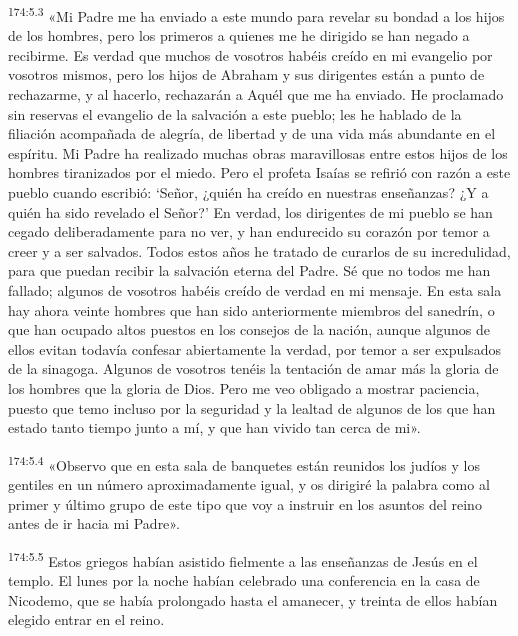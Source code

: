 \par 
\textsuperscript{174:5.3} «Mi Padre me ha enviado a este mundo para revelar su bondad a los hijos de los hombres, pero los primeros a quienes me he dirigido se han negado a recibirme. Es verdad que muchos de vosotros habéis creído en mi evangelio por vosotros mismos, pero los hijos de Abraham y sus dirigentes están a punto de rechazarme, y al hacerlo, rechazarán a Aquél que me ha enviado. He proclamado sin reservas el evangelio de la salvación a este pueblo; les he hablado de la filiación acompañada de alegría, de libertad y de una vida más abundante en el espíritu. Mi Padre ha realizado muchas obras maravillosas entre estos hijos de los hombres tiranizados por el miedo. Pero el profeta Isaías se refirió con razón a este pueblo cuando escribió: `Señor, ¿quién ha creído en nuestras enseñanzas? ¿Y a quién ha sido revelado el Señor?' En verdad, los dirigentes de mi pueblo se han cegado deliberadamente para no ver, y han endurecido su corazón por temor a creer y a ser salvados. Todos estos años he tratado de curarlos de su incredulidad, para que puedan recibir la salvación eterna del Padre. Sé que no todos me han fallado; algunos de vosotros habéis creído de verdad en mi mensaje. En esta sala hay ahora veinte hombres que han sido anteriormente miembros del sanedrín, o que han ocupado altos puestos en los consejos de la nación, aunque algunos de ellos evitan todavía confesar abiertamente la verdad, por temor a ser expulsados de la sinagoga. Algunos de vosotros tenéis la tentación de amar más la gloria de los hombres que la gloria de Dios. Pero me veo obligado a mostrar paciencia, puesto que temo incluso por la seguridad y la lealtad de algunos de los que han estado tanto tiempo junto a mí, y que han vivido tan cerca de mi».

\par 
\textsuperscript{174:5.4} «Observo que en esta sala de banquetes están reunidos los judíos y los gentiles en un número aproximadamente igual, y os dirigiré la palabra como al primer y último grupo de este tipo que voy a instruir en los asuntos del reino antes de ir hacia mi Padre».

\par 
\textsuperscript{174:5.5} Estos griegos habían asistido fielmente a las enseñanzas de Jesús en el templo. El lunes por la noche habían celebrado una conferencia en la casa de Nicodemo, que se había prolongado hasta el amanecer, y treinta de ellos habían elegido entrar en el reino.

